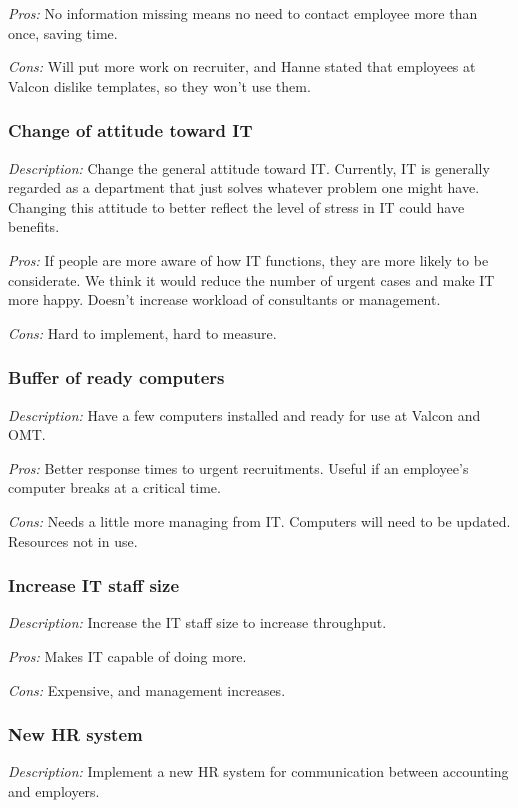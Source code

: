 \noindent \emph{Pros:} No information missing means no need to contact employee more than once, saving time.

\noindent \emph{Cons:} Will put more work on recruiter, and Hanne stated that employees at Valcon dislike templates, so they won't use them.

\subsubsection{Change of attitude toward IT}
\emph{Description:} Change the general attitude toward IT. Currently, IT is generally regarded as a department that just solves whatever problem one might have. Changing this attitude to better reflect the level of stress in IT could have benefits.

\noindent \emph{Pros:} If people are more aware of how IT functions, they are more likely to be considerate. We think it would reduce the number of urgent cases and make IT more happy. Doesn't increase workload of consultants or management.

\noindent \emph{Cons:} Hard to implement, hard to measure.

\subsubsection{Buffer of ready computers}
\emph{Description:} Have a few computers installed and ready for use at Valcon and OMT.

\noindent \emph{Pros:} Better response times to urgent recruitments. Useful if an employee's computer breaks at a critical time.

\noindent \emph{Cons:} Needs a little more managing from IT. Computers will need to be updated. Resources not in use.

\subsubsection{Increase IT staff size}
\emph{Description:} Increase the IT staff size to increase throughput.

\noindent \emph{Pros:} Makes IT capable of doing more.

\noindent \emph{Cons:} Expensive, and management increases.

\subsubsection{New HR system}
\emph{Description:} Implement a new HR system for communication between accounting and employers.

